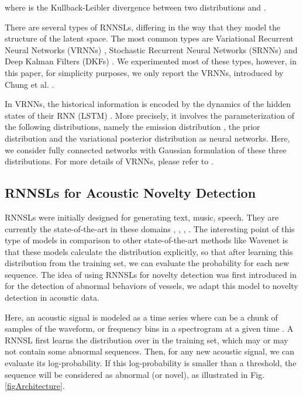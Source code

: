 \documentclass{article}
\begin{document}
where  is the Kullback-Leibler divergence between two distributions  and . 


There are several types of RNNSLs, differing in the way that they model the structure of the latent space. The most common types are Variational Recurrent Neural Networks (VRNNs) \cite{chung_recurrent_2015}, Stochastic Recurrent Neural Networks (SRNNs) \cite{fraccaro_sequential_2016} and Deep Kalman Filters (DKFs) \cite{krishnan_deep_2017}.
We experimented most of these types, however, in this paper, for simplicity purposes, we only report the VRNNs, introduced by Chung et al. \cite{chung_recurrent_2015}.

In VRNNs, the historical information  is encoded by the dynamics of the hidden states of their RNN (LSTM) . 
More precisely, it involves the parameterization of the following distributions, namely 
the emission distribution  , the prior distribution   and the variational posterior distribution  as neural networks.
Here, we consider fully connected networks with Gaussian formulation of these three distributions. For more details of VRNNs, please refer to \cite{chung_recurrent_2015}.


\subsection{RNNSLs for Acoustic Novelty Detection}
\label{secRNNSLsforAcousticNoveltyDetection}
RNNSLs were initially designed for generating text, music, speech. They are currently the state-of-the-art in these domains \cite{boulanger-lewandowski_modeling_2012}, \cite{chung_recurrent_2015}, \cite{fraccaro_sequential_2016}, \cite{maddison_filtering_2017}. The interesting point of this type of models in comparison to other state-of-the-art methods like Wavenet \cite{oord_wavenet:_2016} is that these models calculate the distribution  explicitly, so that after learning this distribution from the training set, we can evaluate the probability for each new sequence. The idea of using RNNSLs for novelty detection was first introduced in \cite{nguyen_multi-task_2018} for the detection of abnormal behaviors of vessels, we adapt this model to novelty detection in acoustic data.

Here, an acoustic signal is modeled as a time series   where  can be a chunk of  samples of the waveform, or  frequency bins  in a spectrogram at a given time . A RNNSL first learns the distribution over  in the training set, which may or may not contain some abnormal sequences. Then, for any new acoustic signal, we can evaluate its log-probability.
If this log-probability is smaller than a threshold, the sequence will be considered as abnormal (or novel), as illustrated in Fig. \ref{figArchitecture}.
 
\end{document}
